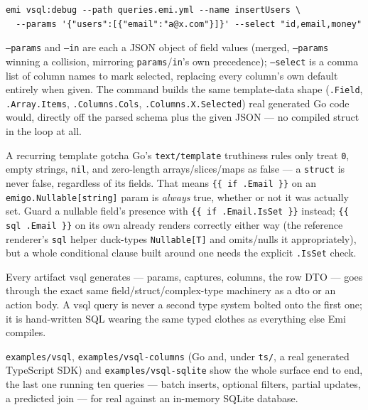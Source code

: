 \begin{lstlisting}
emi vsql:debug --path queries.emi.yml --name insertUsers \
  --params '{"users":[{"email":"a@x.com"}]}' --select "id,email,money"
\end{lstlisting}

\texttt{--params} and \texttt{--in} are each a JSON object of field
values (merged, \texttt{--params} winning a collision, mirroring
\texttt{params}/\texttt{in}'s own precedence); \texttt{--select} is a
comma list of column names to mark selected, replacing every
column's own default entirely when given. The command builds the same
template-data shape (\texttt{.Field}, \texttt{.Array.Items},
\texttt{.Columns.Cols}, \texttt{.Columns.X.Selected}) real generated
Go code would, directly off the parsed schema plus the given JSON ---
no compiled struct in the loop at all.

\begin{sidebar}{A recurring template gotcha}
\small
Go's \texttt{text/template} truthiness rules only treat \texttt{0},
empty strings, \texttt{nil}, and zero-length arrays/slices/maps as
false --- a \texttt{struct} is never false, regardless of its fields.
That means \texttt{\{\{ if .Email \}\}} on an
\texttt{emigo.Nullable[string]} param is \emph{always} true, whether
or not it was actually set. Guard a nullable field's presence with
\texttt{\{\{ if .Email.IsSet \}\}} instead; \texttt{\{\{ sql .Email
\}\}} on its own already renders correctly either way (the reference
renderer's \texttt{sql} helper duck-types \texttt{Nullable[T]} and
omits/nulls it appropriately), but a whole conditional clause built
around one needs the explicit \texttt{.IsSet} check.
\end{sidebar}

\begin{pullquote}
Every artifact vsql generates --- params, captures, columns, the row
DTO --- goes through the exact same field/struct/complex-type
machinery as a dto or an action body. A vsql query is never a second
type system bolted onto the first one; it is hand-written SQL wearing
the same typed clothes as everything else Emi compiles.
\end{pullquote}

\texttt{examples/vsql}, \texttt{examples/vsql-columns} (Go and,
under \texttt{ts/}, a real generated TypeScript SDK) and
\texttt{examples/vsql-sqlite} show the whole surface end to end, the
last one running ten queries --- batch inserts, optional filters,
partial updates, a predicted join --- for real against an in-memory
SQLite database.
